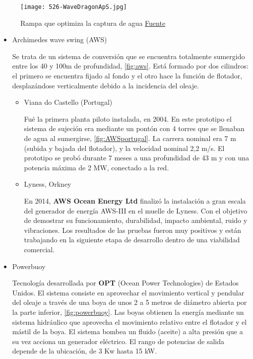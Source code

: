 \begin{figure}
\centering
\texttt{[image: 526-WaveDragonApS.jpg]}
\caption[Rampa que optimiza la captura de agua]{Rampa que optimiza la captura de agua \href{www.wavedragon.net}{Fuente}}
\label{fig:WaveDragonApS}
\end{figure}

\begin{itemize}
\item
  Archimedes wave swing (AWS)

  Se trata de un sistema de conversión que se encuentra totalmente
  sumergido entre los 40 y 100m de profundidad, \autoref{fig:aws}. Está formado por dos
  cilindros: el primero se encuentra fijado al fondo y el otro hace la
  función de flotador, desplazándose verticalmente debido a la
  incidencia del oleaje.



  \begin{itemize}
  \item
    Viana do Castello (Portugal)

    Fué la primera planta piloto instalada, en 2004. En este prototipo
    el sistema de sujeción era mediante un pontón con 4 torres que se
    llenaban de agua al sumergirse, \autoref{fig:AWSportugal}. La carrera nominal era 7 m (subida y
    bajada del flotador), y la velocidad nominal 2,2 m/s. El prototipo
    se probó durante 7 meses a una profundidad de 43 m y con una
    potencia máxima de 2 MW, conectado a la red.



  \item
    Lyness, Orkney

    En 2014, \textbf{AWS Ocean Energy Ltd} \cite{aws17} finalizó la instalación a
    gran escala del generador de energía AWS-III en el muelle de Lyness.
    Con el objetivo de demostrar su funcionamiento, durabilidad, impacto
    ambiental, ruido y vibraciones. Los resultados de las pruebas fueron
    muy positivos y están trabajando en la siguiente etapa de desarrollo
    dentro de una viabilidad comercial.
  \end{itemize}
\item
  Powerbuoy

  Tecnología desarrollada por \textbf{OPT} (Ocean Power Technologies) de
  Estados Unidos. El sistema consiste en aprovechar el movimiento
  vertical y pendular del oleaje a través de una boya de unos 2 a 5
  metros de diámetro abierta por la parte inferior, \autoref{fig:powerbuoy}. Las boyas obtienen
  la energía mediante un sistema hidráulico que aprovecha el movimiento
  relativo entre el flotador y el mástil de la boya. El sistema bombea
  un fluido (aceite) a alta presión que a su vez acciona un generador
  eléctrico. El rango de potencias de salida depende de la ubicación, de
  3 Kw hasta 15 kW.




\end{itemize}
